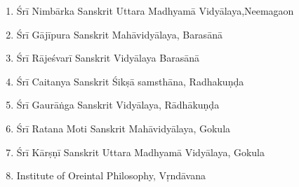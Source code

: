 \begin{enumerate}
\item Śrī Nimbārka Sanskrit Uttara Madhyamā Vidyālaya,\hfil\break Neemagaon 
\item Śrī Gājīpura Sanskrit Mahāvidyālaya, Barasānā 
\item Śrī Rājeśvarī Sanskrit Vidyālaya Barasānā 
\item Śrī Caitanya Sanskrit Śikṣā samsthāna, Radhakuṇḍa 
\item Śrī Gaurāṅga Sanskrit Vidyālaya, Rādhākuṇḍa 
\item Śrī Ratana Moti Sanskrit Mahāvidyālaya, Gokula 
\item Śrī Kārṣṇī Sanskrit Uttara Madhyamā Vidyālaya, Gokula 
\item Institute of Oreintal Philosophy, Vṛndāvana 
\end{enumerate}


